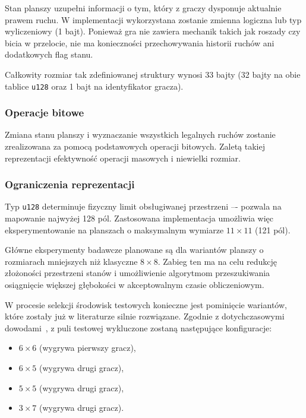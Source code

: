 \documentclass{article}
\begin{document}
Stan planszy uzupełni informacji o tym, który z graczy dysponuje aktualnie prawem ruchu. W implementacji wykorzystana zostanie zmienna logiczna lub typ wyliczeniowy (1 bajt). Ponieważ gra nie zawiera mechanik takich jak roszady czy bicia w przelocie, nie ma konieczności przechowywania historii ruchów ani dodatkowych flag stanu. 

Całkowity rozmiar tak zdefiniowanej struktury wynosi 33 bajty (32 bajty na obie tablice \texttt{u128} oraz 1 bajt na identyfikator gracza).

\subsubsection{Operacje bitowe}

Zmiana stanu planszy i wyznaczanie wszystkich legalnych ruchów zostanie zrealizowana za pomocą podstawowych operacji bitowych. Zaletą takiej reprezentacji efektywność operacji masowych i niewielki rozmiar.

\subsubsection{Ograniczenia reprezentacji}

Typ \texttt{u128} determinuje fizyczny limit obsługiwanej przestrzeni –- pozwala na mapowanie najwyżej 128 pól. Zastosowana implementacja umożliwia więc eksperymentowanie na planszach o maksymalnym wymiarze $11 \times 11$ (121 pól).

Główne eksperymenty badawcze planowane są dla wariantów planszy o rozmiarach mniejszych niż klasyczne $8 \times 8$. Zabieg ten ma na celu redukcję złożoności przestrzeni stanów i umożliwienie algorytmom przeszukiwania osiągnięcie większej głębokości w akceptowalnym czasie obliczeniowym. 

W procesie selekcji środowisk testowych konieczne jest pominięcie wariantów, które zostały już w literaturze silnie rozwiązane. Zgodnie z dotychczasowymi dowodami~\cite{saffidine2012solving}, z puli testowej wykluczone zostaną następujące konfiguracje:

\begin{itemize}
    \item $6 \times 6$ (wygrywa pierwszy gracz),
    \item $6 \times 5$ (wygrywa drugi gracz),
    \item $5 \times 5$ (wygrywa drugi gracz),
    \item $3 \times 7$ (wygrywa drugi gracz).
\end{itemize}
\end{document}
